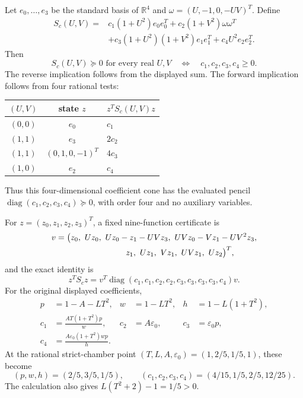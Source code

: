 Let $e_0,\ldots,e_3$ be the standard basis of $\mathbb R^4$ and
$\omega=(U,-1,0,-UV)^T$. Define
\begin{align}
 S_c(U,V)={}&c_1(1+U^2)e_0e_0^T
       +c_2(1+V^2)\omega\omega^T\nonumber\\
 &+c_3(1+U^2)(1+V^2)e_1e_1^T+c_4U^2e_2e_2^T.
 \label{eq:b0-module}
\end{align}
Then
\begin{equation}
 S_c(U,V)\succeq0\text{ for every real }U,V
 \quad\Longleftrightarrow\quad c_1,c_2,c_3,c_4\ge0.
 \label{eq:b0-orthant}
\end{equation}
The reverse implication follows from the displayed sum. The forward
implication follows from four rational tests:
\begin{center}
\begin{tabular}{ccl}
\toprule
$(U,V)$ & state $z$ & $z^TS_c(U,V)z$\\
\midrule
$(0,0)$ & $e_0$ & $c_1$\\
$(1,1)$ & $e_3$ & $2c_2$\\
$(1,1)$ & $(0,1,0,-1)^T$ & $4c_3$\\
$(1,0)$ & $e_2$ & $c_4$\\
\bottomrule
\end{tabular}
\end{center}
Thus this four-dimensional coefficient cone has the evaluated pencil
$\operatorname{diag}(c_1,c_2,c_3,c_4)\succeq0$, with order four and
no auxiliary variables.

For $z=(z_0,z_1,z_2,z_3)^T$, a fixed nine-function certificate is
\begin{align*}
 v={}&\bigl(z_0,\ Uz_0,\ Uz_0-z_1-UVz_3,\
 UVz_0-Vz_1-UV^2z_3,\\
 &\hspace{25mm} z_1,\ Uz_1,\ Vz_1,\ UVz_1,\ Uz_2\bigr)^T,
\end{align*}
and the exact identity is
\[
 z^TS_cz
 =v^T\operatorname{diag}(c_1,c_1,c_2,c_2,
                         c_3,c_3,c_3,c_3,c_4)v.
\]
For the original displayed coefficients,
\begin{align*}
 p&=1-A-LT^2,&w&=1-LT^2,&h&=1-L(1+T^2),\\
 c_1&=\frac{AT(1+T^2)p}{w},&
 c_2&=A\varepsilon_0,&c_3&=\varepsilon_0p,\\
 c_4&=\frac{A\varepsilon_0(1+T^2)wp}{h}.&&&
\end{align*}
At the rational strict-chamber point
$(T,L,A,\varepsilon_0)=(1,2/5,1/5,1)$, these become
\[
 (p,w,h)=(2/5,3/5,1/5),\qquad
 (c_1,c_2,c_3,c_4)=(4/15,1/5,2/5,12/25).
\]
The calculation also gives $L(T^2+2)-1=1/5>0$.

